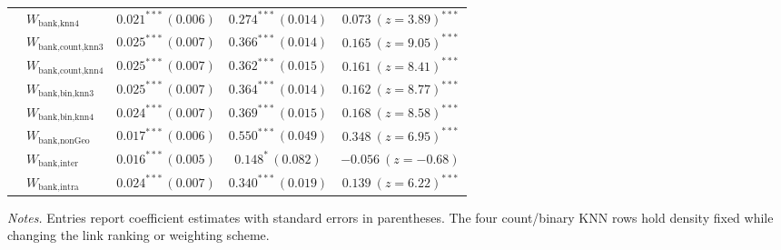 \begin{table}[htbp]
\begin{tabular}{llccc}
     & $W_{\text{bank,knn4}}$ & $0.021^{***}\,(0.006)$ & $0.274^{***}\,(0.014)$ & $0.073\ (z{=}3.89)^{***}$ \\
     & $W_{\text{bank,count,knn3}}$ & $0.025^{***}\,(0.007)$ & $0.366^{***}\,(0.014)$ & $0.165\ (z{=}9.05)^{***}$ \\
     & $W_{\text{bank,count,knn4}}$ & $0.025^{***}\,(0.007)$ & $0.362^{***}\,(0.015)$ & $0.161\ (z{=}8.41)^{***}$ \\
     & $W_{\text{bank,bin,knn3}}$ & $0.025^{***}\,(0.007)$ & $0.364^{***}\,(0.014)$ & $0.162\ (z{=}8.77)^{***}$ \\
     & $W_{\text{bank,bin,knn4}}$ & $0.024^{***}\,(0.007)$ & $0.369^{***}\,(0.015)$ & $0.168\ (z{=}8.58)^{***}$ \\
     & $W_{\text{bank,nonGeo}}$ & $0.017^{***}\,(0.006)$ & $0.550^{***}\,(0.049)$ & $0.348\ (z{=}6.95)^{***}$ \\
     & $W_{\text{bank,inter}}$ & $0.016^{***}\,(0.005)$ & $0.148^{*}\,(0.082)$ & $-0.056\ (z{=}-0.68)$ \\
     & $W_{\text{bank,intra}}$ & $0.024^{***}\,(0.007)$ & $0.340^{***}\,(0.019)$ & $0.139\ (z{=}6.22)^{***}$ \\
    \bottomrule
  \end{tabular}
  \begin{tablenotes}\footnotesize
  \item \emph{Notes.} Entries report coefficient estimates with standard errors in parentheses. The four count/binary KNN rows hold density fixed while changing the link ranking or weighting scheme.
  \end{tablenotes}
\end{table}

\clearpage
 
